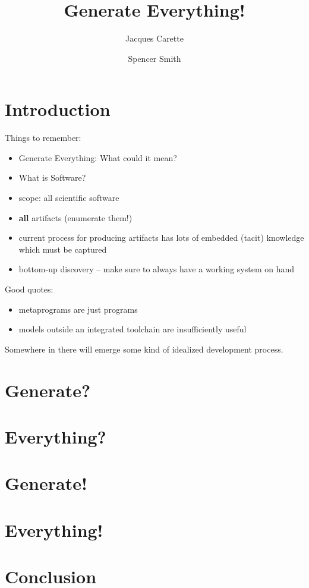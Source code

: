 \documentclass[10pt,twoside,onecolumn,openany,letterpaper]{memoir}
\begin{document}
\title{Generate Everything!}
\author{Jacques Carette \and Spencer Smith}



\maketitle

\chapter{Introduction}

Things to remember:
\begin{itemize}
\item Generate Everything: What could it mean?
\item What is Software?
\item scope: all scientific software
\item \textbf{all} artifacts (enumerate them!)
\item current process for producing artifacts has lots of embedded (tacit)
  knowledge which must be captured
\item bottom-up discovery -- make sure to always have a working system on hand
\end{itemize}

Good quotes:
\begin{itemize}
\item metaprograms are just programs
\item models outside an integrated toolchain are insufficiently useful
\end{itemize}

Somewhere in there will emerge some kind of idealized development process.

\chapter{Generate?}
\chapter{Everything?}
\chapter{Generate!}
\chapter{Everything!}
\chapter{Conclusion}
\end{document}
